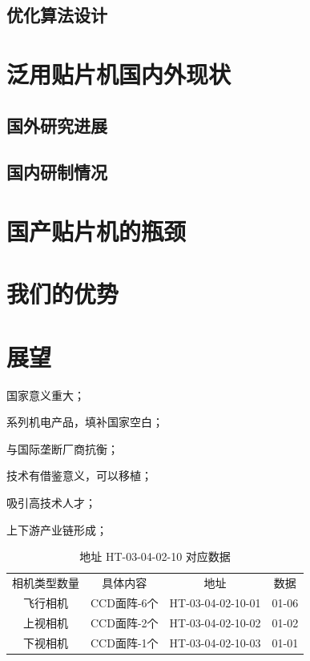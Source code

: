 \documentclass[a4paper]{article}%
\begin{document}
\begin{CJK}{UTF8}{gbsn}
\subsection{优化算法设计}
\section{泛用贴片机国内外现状}
\subsection{国外研究进展}
\subsection{国内研制情况}
\section{国产贴片机的瓶颈}
\section{我们的优势}
\section{展望}
国家意义重大；

系列机电产品，填补国家空白；

与国际垄断厂商抗衡；

技术有借鉴意义，可以移植；

吸引高技术人才；

上下游产业链形成；

\begin{table}[h]
\caption{地址 HT-03-04-02-10 对应数据}\label{HT-03-04-02-10}
\centering
\begin{tabular}{|c|c|c|c|}
相机类型数量 & 具体内容       & 地址                  & 数据  \\
飞行相机   & CCD面阵-6个     & HT-03-04-02-10-01    & 01-06   \\
上视相机   & CCD面阵-2个     & HT-03-04-02-10-02    & 01-02   \\
下视相机   & CCD面阵-1个     & HT-03-04-02-10-03    & 01-01
\end{tabular}
\end{table}




\newpage
\end{CJK}
\end{document}
